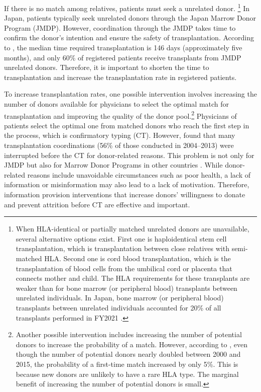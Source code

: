 \documentclass[12pt, a4paper]{article}
\begin{document}
If there is no match among relatives, patients must seek a unrelated donor. \footnote{When HLA-identical or partially matched unrelated donors are unavailable, several alternative options exist. First one is haploidentical stem cell transplantation, which is transplantation between close relatives with semi-matched HLA. Second one is cord blood transplantation, which is the transplantation of blood cells from the umbilical cord or placenta that connects mother and child. The HLA requirements for these transplants are weaker than for bone marrow (or peripheral blood) transplants between unrelated individuals. In Japan, bone marrow (or peripheral blood) transplants between unrelated individuals accounted for 20\% of all transplants performed in FY2021 \citep{JapaneseDataCenterf2022}.} In Japan, patients typically seek unrelated donors through the Japan Marrow Donor Program (JMDP). However, coordination through the JMDP takes time to confirm the donor’s intention and ensure the safety of transplantation. According to \citet{Hirakawa2018}, the median time required transplantation is 146 days (approximately five months), and only 60\% of registered patients receive transplants from JMDP unrelated donors. Therefore, it is important to shorten the time to transplantation and increase the transplantation rate in registered patients.

To increase transplantation rates, one possible intervention involves increasing the number of donors available for physicians to select the optimal match for transplantation and improving the quality of the donor pool.\footnote{Another possible intervention includes increasing the number of potential donors to increase the probability of a match. However, according to \citet{Takanashi2016}, even though the number of potential donors nearly doubled between 2000 and 2015, the probability of a first-time match increased by only 5\%. This is because new donors are unlikely to have a rare HLA type. The marginal benefit of increasing the number of potential donors is small.} Physicians of patients select the optimal one from matched donors who reach the first step in the process, which is confirmatory typing (CT). However, \citet{Hirakawa2018} found that many transplantation coordinations (56\% of those conducted in 2004--2013) were interrupted before the CT for donor-related reasons. This problem is not only for JMDP but also for Marrow Donor Programs in other countries \citep{Haylock2024}. While donor-related reasons include unavoidable circumstances such as poor health, a lack of information or misinformation may also lead to a lack of motivation. Therefore, information provision interventions that increase donors' willingness to donate and prevent attrition before CT are effective and important.
\end{document}
